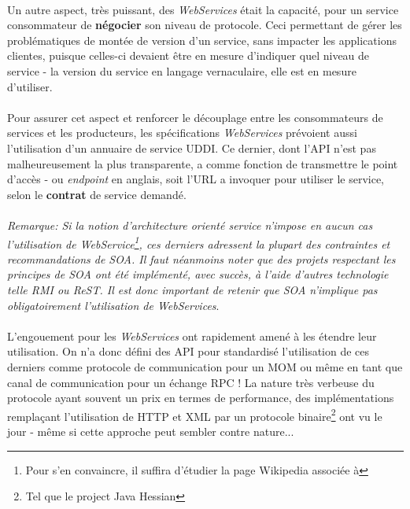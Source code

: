 {  \paragraph{} Un autre aspect, très puissant, des \textit{WebServices} était la capacité, pour un
  service consommateur de \textbf{négocier} son niveau de protocole. Ceci permettant de gérer les
  problématiques de montée de version d'un service, sans impacter les applications clientes, puisque
  celles-ci devaient être en mesure d'indiquer quel niveau de service - la version du service en
  langage vernaculaire, elle est en mesure d'utiliser.

  \paragraph{} Pour assurer cet aspect et renforcer le découplage entre les consommateurs de
  services et les producteurs, les spécifications \textit{WebServices} prévoient aussi l'utilisation
  d'un annuaire de service UDDI. Ce dernier, dont l'API n'est pas malheureusement la plus
  transparente, a comme fonction de transmettre le point d'accès - ou \textit{endpoint} en anglais,
  soit l'URL a invoquer pour utiliser le service, selon le \textbf{contrat} de service demandé.

  \paragraph{} \paragraph{} \textit{Remarque: Si la notion d'architecture orienté service n'impose en aucun cas
  l'utilisation de WebService\footnote{Pour s'en convaincre, il suffira d'étudier la page Wikipedia
  associée à }, ces derniers adressent la plupart des contraintes et
  recommandations de SOA. Il faut néanmoins noter que des projets respectant les principes de SOA ont
  été implémenté, avec succès, à l'aide d'autres technologie telle RMI ou ReST. Il est donc
  important de retenir que SOA n'implique pas obligatoirement l'utilisation de
  \textit{WebServices}}.

  \paragraph{} L'engouement pour les \textit{WebServices} ont rapidement amené à les étendre leur
  utilisation. On n'a donc défini des API pour standardisé l'utilisation de ces derniers comme
  protocole de communication pour un MOM ou même en tant que canal de communication pour un échange
  RPC ! La nature très verbeuse du protocole ayant souvent un prix en termes de performance, des
  implémentations remplaçant l'utilisation de HTTP et XML par un protocole binaire\footnote{Tel que
  le project Java Hessian} ont vu le jour - même si cette approche peut sembler contre nature...

}

